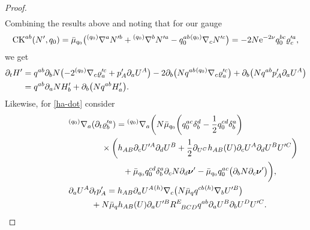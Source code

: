 \documentclass[pdftex]{sigma}
\def\ptl{\partial}%
\def\mbo#1{\boldsymbol{#1}}%
\def\grad{{\nabla}}%
\newcommand{\leftexp}[2]{{\vphantom{#2}}^{#1}{#2}}
\def\halb{\frac{1}{2}}%
\numberwithin{equation}{section}
\begin{document}
\begin{proof}
\begin{gather*}
\end{gather*}
Combining the results above and noting that for our gauge
\begin{align*}
{\rm CK}^{ab} (N', q_0) = \bar{\mu}_{q_0} \bigl(\leftexp{(q_0)}{\grad}^a N'^b + \leftexp{(q_0)}{\grad}^b N'^a - q^{ab}_0 \leftexp{(q_0)}{\grad}_c N'^c\bigr) = - 2 N {\rm e}^{-2 \nu} q^{bc}_0 \varrho'^a_c,
\end{align*}
we get
\begin{align*}
\ptl_t H' &{}= q^{ab} \ptl_b N \bigl(-2 \leftexp{(q_0)}{\grad}_c \varrho'^c_a + p'_A \ptl_a U^A\bigr) -2 \ptl_b \bigl(N q^{ab} \leftexp{(q_0)}{\grad}_c \varrho'^c_a\bigr) + \ptl_b \bigl(N q^{ab} p'_A \ptl_a U^A\bigr) \\
&{}= q^{ab} \ptl_a N H'_b + \ptl_b \bigl(N q^{ab} H'_a\bigr).
\end{align*}
Likewise, for \eqref{ha-dot} consider
\begin{gather*}
 \leftexp{(q_0)}{\grad}_a (\ptl_t \varrho'^a_b) = \leftexp{(q_0)}{\grad}_a \biggl(N \bar{\mu}_{q_0} \biggl(q^{ac}_0 \delta^d_b - \halb q_0^{cd} \delta^a_b\biggr)\notag\\ \hphantom{\leftexp{(q_0)}{\grad}_a (\ptl_t \varrho'^a_b) =\leftexp{(q_0)}{\grad}_a \biggl(}{}
 \times\biggl(h_{AB} \ptl_c U'^A \ptl_d U^B+ \halb \ptl_{U^C} h_{AB} (U) \ptl_c U^A \ptl_d U^B U'^C\biggr) \notag\\
 \hphantom{\leftexp{(q_0)}{\grad}_a (\ptl_t \varrho'^a_b) =\leftexp{(q_0)}{\grad}_a \biggl(}{}
 +\bar{\mu}_{q_0} q_0^{cd} \delta^a_b \ptl_c N \ptl_d \mbo{\nu}' - \bar{\mu}_{q_0} q^{ac}_0 \bigl(\ptl_b N \ptl_c \mbo{\nu}'\bigr) \biggr), \\
\ptl_a U^A \ptl_t p'_A = h_{AB} \ptl_a U^A \leftexp{(h)}{\grad}_c \bigl(N \bar{\mu}_q q^{cb} \leftexp{(h)}{\grad}_b U'^B\bigr) \notag\\ \hphantom{\ptl_a U^A \ptl_t p'_A =}{}
+ N \bar{\mu}_q h_{AB} (U) \ptl_a U'^B R^{E}_{\,\,\,\,BCD} q^{ab} \ptl_a U^B \ptl_b U^D U'^C.
\end{gather*}


\end{proof}
\end{document}
